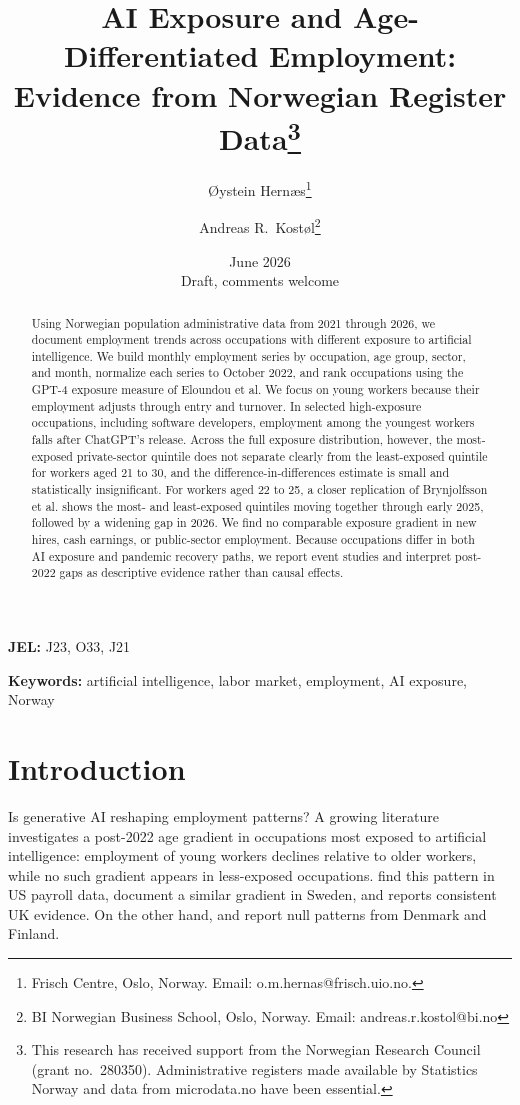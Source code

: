 \documentclass[12pt]{article}
\title{\textbf{AI Exposure and Age-Differentiated Employment:\\Evidence from Norwegian Register Data}\thanks{This research has received support from the Norwegian Research Council (grant no.\ 280350). Administrative registers made available by Statistics Norway and data from microdata.no have been essential.}}
\author{
  {\O}ystein Hern{\ae}s\thanks{Frisch Centre, Oslo, Norway. Email: o.m.hernas@frisch.uio.no.}
  \and
  Andreas R.\ Kost{\o}l\thanks{BI Norwegian Business School, Oslo, Norway. Email: andreas.r.kostol@bi.no}
}
\date{June 2026\\[6pt]\small Draft, comments welcome}
\begin{document}
\maketitle

\begin{abstract}
\noindent
Using Norwegian population administrative data from 2021 through 2026, we document employment trends across occupations with different exposure to artificial intelligence. We build monthly employment series by occupation, age group, sector, and month, normalize each series to October 2022, and rank occupations using the GPT-4 exposure measure of Eloundou et al. We focus on young workers because their employment adjusts through entry and turnover. In selected high-exposure occupations, including software developers, employment among the youngest workers falls after ChatGPT's release. Across the full exposure distribution, however, the most-exposed private-sector quintile does not separate clearly from the least-exposed quintile for workers aged 21 to 30, and the difference-in-differences estimate is small and statistically insignificant. For workers aged 22 to 25, a closer replication of Brynjolfsson et al. shows the most- and least-exposed quintiles moving together through early 2025, followed by a widening gap in 2026. We find no comparable exposure gradient in new hires, cash earnings, or public-sector employment. Because occupations differ in both AI exposure and pandemic recovery paths, we report event studies and interpret post-2022 gaps as descriptive evidence rather than causal effects.
\end{abstract}

\textbf{JEL:} J23, O33, J21

\textbf{Keywords:} artificial intelligence, labor market, employment, AI exposure, Norway

\clearpage
\setcounter{page}{1}


\section{Introduction}
\label{sec:introduction}

Is generative AI reshaping employment patterns? A growing literature investigates a post-2022 age gradient in occupations most exposed to artificial intelligence: employment of young workers declines relative to older workers, while no such gradient appears in less-exposed occupations. \cite{brynjolfsson2025} find this pattern in US payroll data, \cite{lodefalk2026} document a similar gradient in Sweden, and \cite{teeselink2025} reports consistent UK evidence. On the other hand, \cite{humlum2026} and \cite{kauhanen2026} report null patterns from Denmark and Finland.
\end{document}
